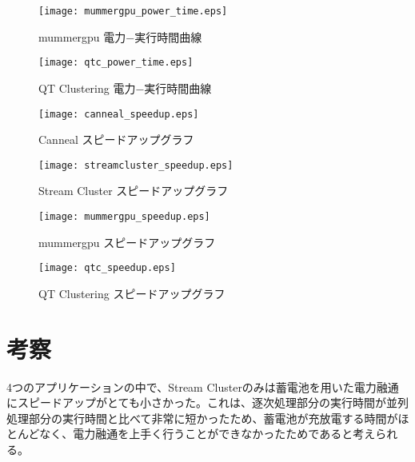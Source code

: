 \begin{figure}[t]
 \begin{center}
  \texttt{[image: mummergpu\_power\_time.eps]}
 \end{center}
 \caption{mummergpu 電力−実行時間曲線}
 \label{fig:mummergpu_power_time}
\end{figure}

\begin{figure}[t]
 \begin{center}
  \texttt{[image: qtc\_power\_time.eps]}
 \end{center}
 \caption{QT Clustering 電力−実行時間曲線}
 \label{fig:qtclustering_power_time}
\end{figure}

\begin{figure}[t]
 \begin{center}
  \texttt{[image: canneal\_speedup.eps]}
 \end{center}
 \caption{Canneal スピードアップグラフ}
 \label{fig:canneal_speedup}
\end{figure}

\begin{figure}[t]
 \begin{center}
  \texttt{[image: streamcluster\_speedup.eps]}
 \end{center}
 \caption{Stream Cluster スピードアップグラフ}
 \label{fig:streamcluster_speedup}
\end{figure}

\begin{figure}[t]
 \begin{center}
  \texttt{[image: mummergpu\_speedup.eps]}
 \end{center}
 \caption{mummergpu スピードアップグラフ}
 \label{fig:mummergpu_speedup}
\end{figure}

\begin{figure}[t]
 \begin{center}
  \texttt{[image: qtc\_speedup.eps]}
 \end{center}
 \caption{QT Clustering スピードアップグラフ}
 \label{fig:qtclustering_speedup}
\end{figure}


\section{考察}
\label{sec:discussion}

4つのアプリケーションの中で、Stream Clusterのみは蓄電池を用いた電力融通にスピードアップがとても小さかった。これは、逐次処理部分の実行時間が並列処理部分の実行時間と比べて非常に短かったため、蓄電池が充放電する時間がほとんどなく、電力融通を上手く行うことができなかったためであると考えられる。

